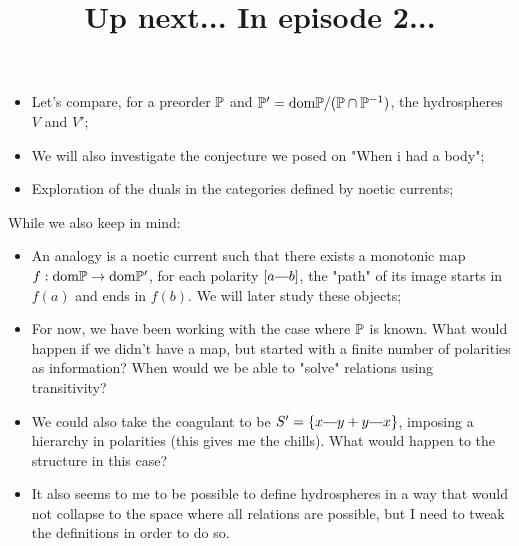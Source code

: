 

\title{Up next... In episode 2...}


	\maketitle
	\begin{itemize}
		\item Let's compare, for a preorder $\mathbb{P}$ and $\mathbb{P}' = \text{dom} \mathbb{P}/(\mathbb{P} \cap \mathbb{P}^{-1})$, the hydrospheres $V$ and $V'$;
		\item We will also investigate the conjecture we posed on "When i had a body";
		\item Exploration of the duals in the categories defined by noetic currents;
	\end{itemize}
	While we also keep in mind:
	\begin{itemize}
		\item An analogy is a noetic current such that there exists a monotonic map $f: \text{dom} \mathbb{P} \to \text{dom} \mathbb{P}'$, for each polarity $[a \connect b]$, the "path" of its image starts in $f(a)$ and ends in $f(b)$. We will later study these objects;
		\item For now, we have been working with the case where $\mathbb{P}$ is known. What would happen if we didn't have a map, but started with a finite number of polarities as information? When would we be able to "solve" relations using transitivity?
		\item We could also take the coagulant to be $S' = \{ x \connect y + y \connect x\}$, imposing a hierarchy in polarities (this gives me the chills). What would happen to the structure in this case?
		\item It also seems to me to be possible to define hydrospheres in a way that would not collapse to the space where all relations are possible, but I need to tweak the definitions in order to do so.
	\end{itemize}
